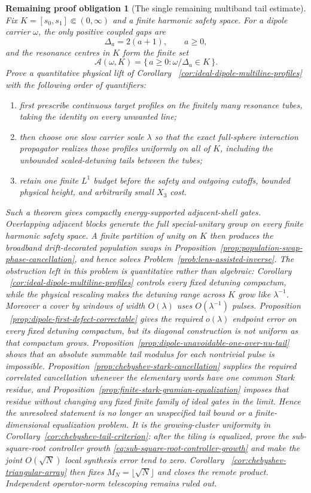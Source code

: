 \documentclass[11pt]{article}
\newtheorem{problem}[theorem]{Remaining proof obligation}
\theoremstyle{remark}
\begin{document}
\begin{problem}[The single remaining multiband tail estimate]
\label{prob:dipole-multiband-tail}
Fix $K=[s_0,s_1]\Subset(0,\infty)$ and a finite harmonic safety space.
For a dipole carrier $\omega$, the only positive coupled gaps are
\[
 \Delta_a=2(a+1),\qquad a\geq0,
\]
and the resonance centres in $K$ form the finite set
\[
 \mathcal A(\omega,K)
 =\{\,a\geq0:\omega/\Delta_a\in K\,\}.
\]
Prove a quantitative physical lift of Corollary
~\ref{cor:ideal-dipole-multiline-profiles} with the following order of
quantifiers:
\begin{enumerate}
\item first prescribe continuous target profiles on the finitely many
resonance tubes, taking the identity on every unwanted line;
\item then choose one slow carrier scale $\lambda$ so that the exact
full-sphere interaction propagator realizes those profiles uniformly on
\emph{all} of $K$, including the unbounded scaled-detuning tails between the
tubes;
\item retain one finite $L^1$ budget before the safety and outgoing cutoffs,
bounded physical height, and arbitrarily small $X_3$ cost.
\end{enumerate}
Such a theorem gives compactly energy-supported adjacent-shell gates.
Overlapping adjacent blocks generate the full special-unitary group on every
finite harmonic safety space.  A finite partition of unity on $K$ then
produces the broadband drift-decorated population swaps in
Proposition~\ref{prop:population-swap-phase-cancellation}, and hence solves
Problem~\ref{prob:lens-assisted-inverse}.  The obstruction left in this
problem is quantitative rather than algebraic: Corollary
~\ref{cor:ideal-dipole-multiline-profiles} controls every fixed detuning
compactum, while the physical rescaling makes the detuning range across
$K$ grow like $\lambda^{-1}$.  Moreover a cover by windows of width
$O(\lambda)$ uses $O(\lambda^{-1})$ pulses.  Proposition
~\ref{prop:dipole-first-defect-correctable} gives the required
$o(\lambda)$ endpoint error on every fixed detuning compactum, but its
diagonal construction is not uniform as that compactum grows.
Proposition~\ref{prop:dipole-unavoidable-one-over-nu-tail} shows that an
absolute summable tail modulus for each nontrivial pulse is impossible.
Proposition~\ref{prop:chebyshev-stark-cancellation} supplies the required
correlated cancellation whenever the elementary words have one common Stark
residue, and Proposition~\ref{prop:finite-stark-gramian-equalization} imposes
that residue without changing any fixed finite family of ideal gates in the
limit.  Hence the unresolved statement is no longer an unspecified tail bound
or a finite-dimensional equalization problem.  It is the growing-cluster
uniformity in Corollary~\ref{cor:chebyshev-tail-criterion}: after the tiling is
equalized, prove the sub-square-root controller growth
\eqref{eq:sub-square-root-controller-growth} and make the joint
$O(\sqrt N)$ local synthesis error tend to zero.  Corollary
~\ref{cor:chebyshev-triangular-array} then fixes
$M_N=\lfloor\sqrt N\rfloor$ and closes the remote product.  Independent
operator-norm telescoping remains ruled out.


\end{problem}
\end{document}
